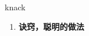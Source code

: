 
\begin{frame}
{\huge knack}
\begin{center}
\begin{enumerate}\Large
  \item \textbf{诀窍，聪明的做法}
\end{enumerate}
\end{center}
\end{frame}
